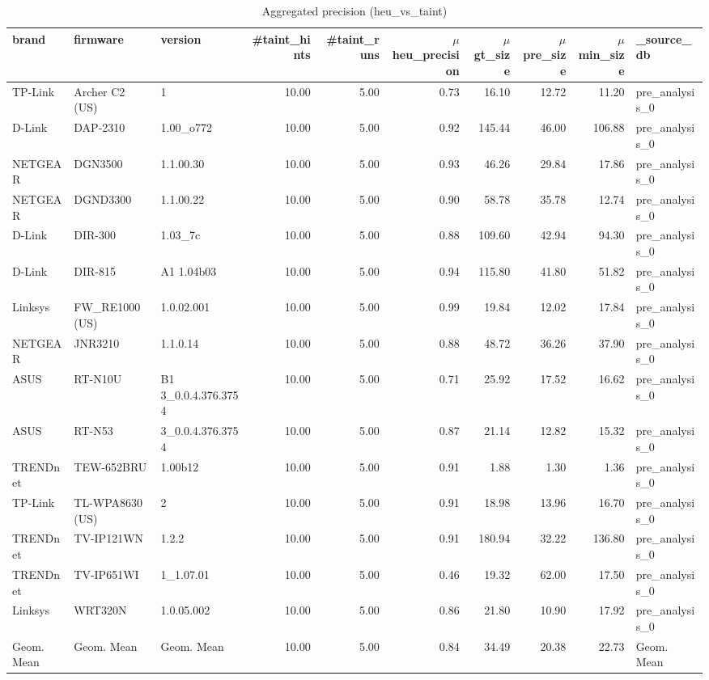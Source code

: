 \begin{table}[ht!]
\centering
\footnotesize
\begin{tabular}{| l | l | l | r | r | r | r | r | r | l |}
\hline
\textbf{brand} & \textbf{firmware} & \textbf{version} & \textbf{\#taint\_hints} & \textbf{\#taint\_runs} & \textbf{$\mu$heu\_precision} & \textbf{$\mu$gt\_size} & \textbf{$\mu$pre\_size} & \textbf{$\mu$min\_size} & \textbf{\_source\_db} \\
\hline
TP-Link & Archer C2 (US) & 1 & 10.00 & 5.00 & 0.73 & 16.10 & 12.72 & 11.20 & pre\_analysis\_0 \\
D-Link & DAP-2310 & 1.00\_o772 & 10.00 & 5.00 & 0.92 & 145.44 & 46.00 & 106.88 & pre\_analysis\_0 \\
NETGEAR & DGN3500 & 1.1.00.30 & 10.00 & 5.00 & 0.93 & 46.26 & 29.84 & 17.86 & pre\_analysis\_0 \\
NETGEAR & DGND3300 & 1.1.00.22 & 10.00 & 5.00 & 0.90 & 58.78 & 35.78 & 12.74 & pre\_analysis\_0 \\
D-Link & DIR-300 & 1.03\_7c & 10.00 & 5.00 & 0.88 & 109.60 & 42.94 & 94.30 & pre\_analysis\_0 \\
D-Link & DIR-815 & A1 1.04b03 & 10.00 & 5.00 & 0.94 & 115.80 & 41.80 & 51.82 & pre\_analysis\_0 \\
Linksys & FW\_RE1000 (US) & 1.0.02.001 & 10.00 & 5.00 & 0.99 & 19.84 & 12.02 & 17.84 & pre\_analysis\_0 \\
NETGEAR & JNR3210 & 1.1.0.14 & 10.00 & 5.00 & 0.88 & 48.72 & 36.26 & 37.90 & pre\_analysis\_0 \\
ASUS & RT-N10U & B1 3\_0.0.4.376.3754 & 10.00 & 5.00 & 0.71 & 25.92 & 17.52 & 16.62 & pre\_analysis\_0 \\
ASUS & RT-N53 & 3\_0.0.4.376.3754 & 10.00 & 5.00 & 0.87 & 21.14 & 12.82 & 15.32 & pre\_analysis\_0 \\
TRENDnet & TEW-652BRU & 1.00b12 & 10.00 & 5.00 & 0.91 & 1.88 & 1.30 & 1.36 & pre\_analysis\_0 \\
TP-Link & TL-WPA8630 (US) & 2 & 10.00 & 5.00 & 0.91 & 18.98 & 13.96 & 16.70 & pre\_analysis\_0 \\
TRENDnet & TV-IP121WN & 1.2.2 & 10.00 & 5.00 & 0.91 & 180.94 & 32.22 & 136.80 & pre\_analysis\_0 \\
TRENDnet & TV-IP651WI & 1\_1.07.01 & 10.00 & 5.00 & 0.46 & 19.32 & 62.00 & 17.50 & pre\_analysis\_0 \\
Linksys & WRT320N & 1.0.05.002 & 10.00 & 5.00 & 0.86 & 21.80 & 10.90 & 17.92 & pre\_analysis\_0 \\
\hline
Geom. Mean & Geom. Mean & Geom. Mean & 10.00 & 5.00 & 0.84 & 34.49 & 20.38 & 22.73 & Geom. Mean \\
\hline
\end{tabular}
\caption{Aggregated precision (heu\_vs\_taint)}
\label{tab:agg_results}
\end{table}